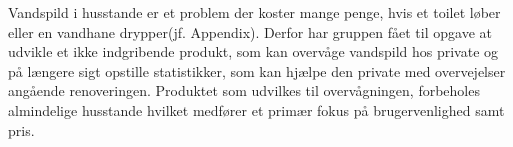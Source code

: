 Vandspild i husstande er et problem der koster mange penge, hvis et toilet løber eller en vandhane drypper(jf. Appendix). Derfor har gruppen fået til opgave at udvikle et ikke indgribende produkt, som kan overvåge vandspild hos private og på længere sigt opstille statistikker, som kan hjælpe den private med overvejelser angående renoveringen. Produktet som udvilkes til overvågningen, forbeholes almindelige husstande hvilket medfører et primær fokus på brugervenlighed samt pris.\newline

